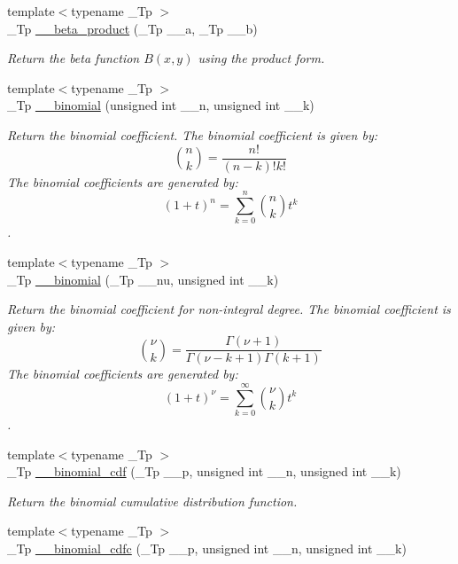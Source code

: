 \begin{DoxyCompactItemize}
{\footnotesize template$<$typename \+\_\+\+Tp $>$ }\\\+\_\+\+Tp \hyperlink{namespacestd_1_1____detail_a9baa688a27befab7fa48ccfb4a87a9ca}{\+\_\+\+\_\+beta\+\_\+product} (\+\_\+\+Tp \+\_\+\+\_\+a, \+\_\+\+Tp \+\_\+\+\_\+b)
\begin{DoxyCompactList}\small\item\em Return the beta function $B(x,y)$ using the product form. \end{DoxyCompactList}\item 
{\footnotesize template$<$typename \+\_\+\+Tp $>$ }\\\+\_\+\+Tp \hyperlink{namespacestd_1_1____detail_a4483574682ad034be17c75ef29892b02}{\+\_\+\+\_\+binomial} (unsigned int \+\_\+\+\_\+n, unsigned int \+\_\+\+\_\+k)
\begin{DoxyCompactList}\small\item\em Return the binomial coefficient. The binomial coefficient is given by\+: \[ \binom{n}{k} = \frac{n!}{(n-k)! k!} \] The binomial coefficients are generated by\+: \[ \left(1 + t\right)^n = \sum_{k=0}^n \binom{n}{k} t^k \]. \end{DoxyCompactList}\item 
{\footnotesize template$<$typename \+\_\+\+Tp $>$ }\\\+\_\+\+Tp \hyperlink{namespacestd_1_1____detail_a9ac7d44eebfe3e1a3fb5ebbd9c08bd55}{\+\_\+\+\_\+binomial} (\+\_\+\+Tp \+\_\+\+\_\+nu, unsigned int \+\_\+\+\_\+k)
\begin{DoxyCompactList}\small\item\em Return the binomial coefficient for non-\/integral degree. The binomial coefficient is given by\+: \[ \binom{\nu}{k} = \frac{\Gamma(\nu+1)}{\Gamma(\nu-k+1) \Gamma(k+1)} \] The binomial coefficients are generated by\+: \[ \left(1 + t\right)^\nu = \sum_{k=0}^\infty \binom{\nu}{k} t^k \]. \end{DoxyCompactList}\item 
{\footnotesize template$<$typename \+\_\+\+Tp $>$ }\\\+\_\+\+Tp \hyperlink{namespacestd_1_1____detail_aefa3217863e0f50cd8f5379947cefcbd}{\+\_\+\+\_\+binomial\+\_\+cdf} (\+\_\+\+Tp \+\_\+\+\_\+p, unsigned int \+\_\+\+\_\+n, unsigned int \+\_\+\+\_\+k)
\begin{DoxyCompactList}\small\item\em Return the binomial cumulative distribution function. \end{DoxyCompactList}\item 
{\footnotesize template$<$typename \+\_\+\+Tp $>$ }\\\+\_\+\+Tp \hyperlink{namespacestd_1_1____detail_a1fd732a432f73686c97311e6976a0e76}{\+\_\+\+\_\+binomial\+\_\+cdfc} (\+\_\+\+Tp \+\_\+\+\_\+p, unsigned int \+\_\+\+\_\+n, unsigned int \+\_\+\+\_\+k)

\end{DoxyCompactItemize}
